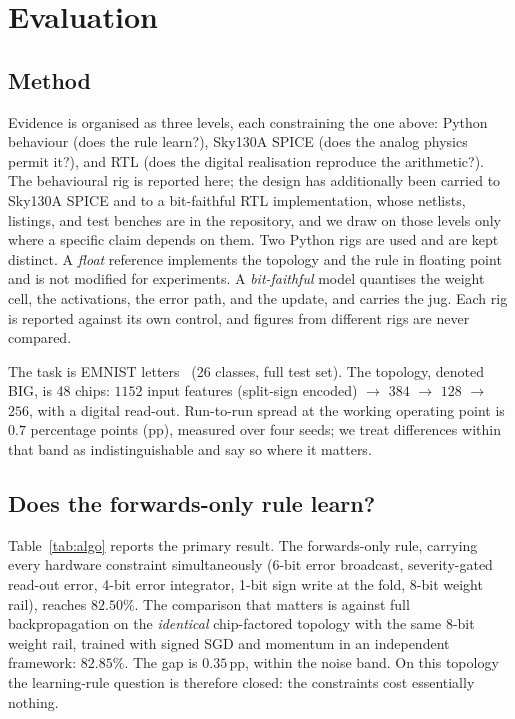 \documentclass[11pt]{article}
\begin{document}
\section{Evaluation}\label{sec:results}

\subsection{Method}

Evidence is organised as three levels, each constraining the one above: Python behaviour (does the
rule learn?), Sky130A SPICE (does the analog physics permit it?), and RTL (does the digital
realisation reproduce the arithmetic?). The behavioural rig is reported here; the design has
additionally been carried to Sky130A SPICE and to a bit-faithful RTL implementation, whose netlists,
listings, and test benches are in the repository, and we draw on those levels only where a specific
claim depends on them. Two Python rigs are used and are kept distinct. A \emph{float} reference
implements the topology and the rule in floating point and is not modified for experiments. A
\emph{bit-faithful} model quantises the weight cell, the activations, the error path, and the update,
and carries the jug. Each rig is reported against its own control, and figures from different rigs are
never compared.

The task is EMNIST letters~\cite{cohen2017emnist} (26 classes, full test set). The topology, denoted
BIG, is 48 chips: $1152$ input features (split-sign encoded) $\to$ $384$ $\to$ $128$ $\to$ $256$,
with a digital read-out. Run-to-run spread at the working operating point is $0.7$ percentage points
(pp), measured over four seeds; we treat differences within that band as indistinguishable and say so
where it matters.

\subsection{Does the forwards-only rule learn?}

Table~\ref{tab:algo} reports the primary result. The forwards-only rule, carrying every hardware
constraint simultaneously (6-bit error broadcast, severity-gated read-out error, 4-bit error
integrator, 1-bit sign write at the fold, 8-bit weight rail), reaches $82.50\%$. The comparison that
matters is against full backpropagation on the \emph{identical} chip-factored topology with the same
8-bit weight rail, trained with signed SGD and momentum in an independent framework: $82.85\%$. The
gap is $0.35$\,pp, within the noise band. On this topology the learning-rule question is therefore
closed: the constraints cost essentially nothing.
\end{document}
